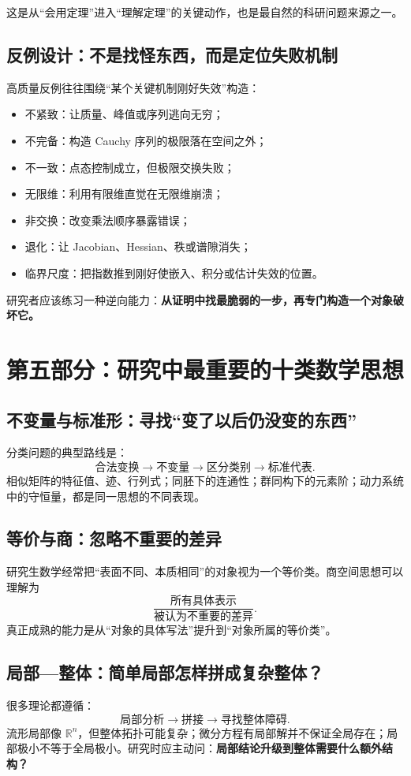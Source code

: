\documentclass[11pt,a4paper]{ctexart}
\newcommand{\concept}[1]{\textbf{\color{deepblue}#1}}
\newcommand{\R}{\mathbb{R}}
\begin{document}
这是从“会用定理”进入“理解定理”的关键动作，也是最自然的科研问题来源之一。

\subsection{反例设计：不是找怪东西，而是定位失败机制}

高质量反例往往围绕“某个关键机制刚好失效”构造：
\begin{itemize}
  \item 不紧致：让质量、峰值或序列逃向无穷；
  \item 不完备：构造 Cauchy 序列的极限落在空间之外；
  \item 不一致：点态控制成立，但极限交换失败；
  \item 无限维：利用有限维直觉在无限维崩溃；
  \item 非交换：改变乘法顺序暴露错误；
  \item 退化：让 Jacobian、Hessian、秩或谱隙消失；
  \item 临界尺度：把指数推到刚好使嵌入、积分或估计失效的位置。
\end{itemize}

研究者应该练习一种逆向能力：\concept{从证明中找最脆弱的一步，再专门构造一个对象破坏它。}

\section{第五部分：研究中最重要的十类数学思想}

\subsection{不变量与标准形：寻找“变了以后仍没变的东西”}
分类问题的典型路线是：
\[
\text{合法变换}\to\text{不变量}\to\text{区分类别}\to\text{标准代表}.
\]
相似矩阵的特征值、迹、行列式；同胚下的连通性；群同构下的元素阶；动力系统中的守恒量，都是同一思想的不同表现。

\subsection{等价与商：忽略不重要的差异}
研究生数学经常把“表面不同、本质相同”的对象视为一个等价类。商空间思想可以理解为
\[
\frac{\text{所有具体表示}}{\text{被认为不重要的差异}}.
\]
真正成熟的能力是从“对象的具体写法”提升到“对象所属的等价类”。

\subsection{局部—整体：简单局部怎样拼成复杂整体？}
很多理论都遵循：
\[
\text{局部分析}\to\text{拼接}\to\text{寻找整体障碍}.
\]
流形局部像 $\R^n$，但整体拓扑可能复杂；微分方程有局部解并不保证全局存在；局部极小不等于全局极小。研究时应主动问：\textbf{局部结论升级到整体需要什么额外结构？}
\end{document}

